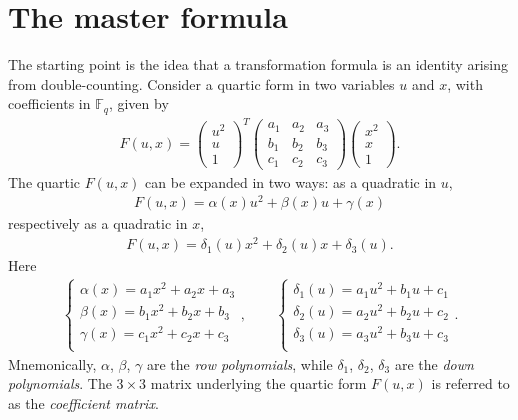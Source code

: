 \documentclass[11pt]{amsart}
\newcommand{\F}{\mathbb{F}}
\newcommand{\Fq}{\F_{\!q}}
\theoremstyle{definition}
\begin{document}
\section{The master formula}\label{M}
The starting point is the idea that a transformation formula is an identity arising from double-counting. Consider a quartic form in two variables $u$ and $x$, with coefficients in $\Fq$, given by
\begin{align}
F(u,x)=  \begin{pmatrix} u^2 \\ u \\ 1\end{pmatrix}^T
\begin{pmatrix}
a_1 & a_2 &a_3\\
b_1 & b_2 &b_3\\
c_1 & c_2 &c_3
\end{pmatrix} \begin{pmatrix} x^2 \\ x \\ 1\end{pmatrix}.
\end{align}
The quartic $F(u,x)$ can be expanded in two ways: as a quadratic in $u$,
\begin{align}\label{eq: Finu}
F(u,x)=\alpha(x)u^2+\beta(x)u+\gamma(x)
\end{align}
respectively as a quadratic in $x$,
\begin{align}\label{eq: Finx}
F(u,x)=\delta_1(u)x^2+\delta_2(u)x+\delta_3(u).
\end{align}
Here
\begin{align}\label{pols}
\begin{cases}
\alpha(x)=a_1x^2+a_2x+a_3\\
\beta(x)=b_1x^2+b_2x+b_3\\
\gamma(x)=c_1x^2+c_2x+c_3\\
\end{cases},\qquad 
\begin{cases}
\delta_1(u)=a_1u^2+b_1u+c_1\\
\delta_2(u)=a_2u^2+b_2u+c_2\\
\delta_3(u)=a_3u^2+b_3u+c_3\\
\end{cases}.
\end{align}
Mnemonically, $\alpha$, $\beta$, $\gamma$ are the \emph{row polynomials}, while $\delta_1$, $\delta_2$, $\delta_3$ are the \emph{down polynomials}. The $3\times 3$ matrix underlying the quartic form $F(u,x)$ is referred to as the \emph{coefficient matrix}.
\end{document}
